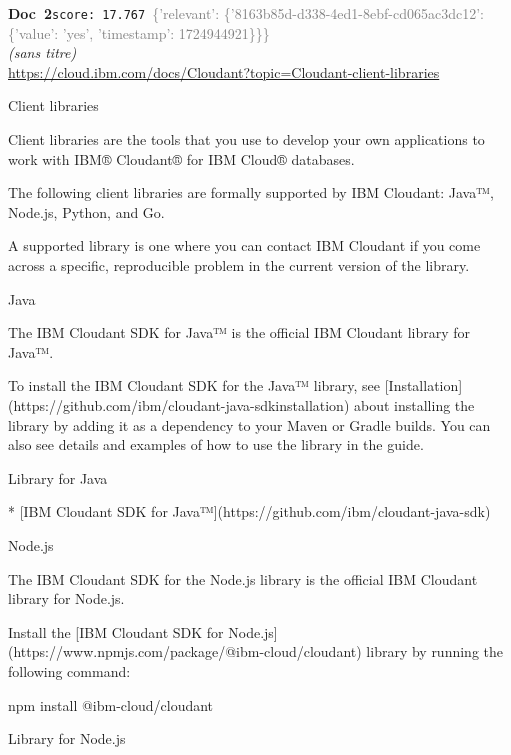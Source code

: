 \documentclass[a4paper,11pt]{article}
\begin{document}
\begin{docenv}
{\footnotesize\textcolor{doccolor}{\textbf{Doc~2}}}\hfill{\tiny\texttt{score:~17.767}}\ {\tiny\textcolor{gray}{\{'relevant': \{'8163b85d-d338-4ed1-8ebf-cd065ac3dc12': \{'value': 'yes', 'timestamp': 1724944921\}\}\}}}\\[3pt]
{\small\textit{(sans titre)}}\\[2pt]
{\tiny\url{https://cloud.ibm.com/docs/Cloudant?topic=Cloudant-client-libraries}}\\[4pt]
{\footnotesize 
Client libraries 

Client libraries are the tools that you use to develop your own applications to work with IBM® Cloudant® for IBM Cloud® databases.

The following client libraries are formally supported by IBM Cloudant: Java™, Node.js, Python, and Go.

A supported library is one where you can contact IBM Cloudant if you come across a specific, reproducible problem in the current version of the library.



 Java 

The IBM Cloudant SDK for Java™ is the official IBM Cloudant library for Java™.

To install the IBM Cloudant SDK for the Java™ library, see [Installation](https://github.com/ibm/cloudant-java-sdkinstallation) about installing the library by adding it as a dependency to your Maven or Gradle builds. You can also see details and examples of how to use the library in the guide.



 Library for Java 



* [IBM Cloudant SDK for Java™](https://github.com/ibm/cloudant-java-sdk)









 Node.js 

The IBM Cloudant SDK for the Node.js library is the official IBM Cloudant library for Node.js.

Install the [IBM Cloudant SDK for Node.js](https://www.npmjs.com/package/@ibm-cloud/cloudant) library by running the following command:

npm install @ibm-cloud/cloudant



 Library for Node.js 



}
\end{docenv}
\end{document}
